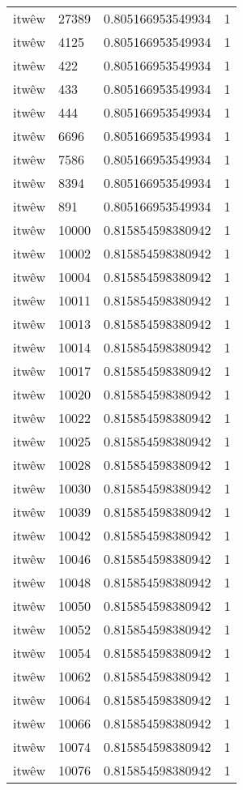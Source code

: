 \begin{longtable}{llll}
itwêw & 27389 & 0.805166953549934 & 1 \\
itwêw & 4125 & 0.805166953549934 & 1 \\
itwêw & 422 & 0.805166953549934 & 1 \\
itwêw & 433 & 0.805166953549934 & 1 \\
itwêw & 444 & 0.805166953549934 & 1 \\
itwêw & 6696 & 0.805166953549934 & 1 \\
itwêw & 7586 & 0.805166953549934 & 1 \\
itwêw & 8394 & 0.805166953549934 & 1 \\
itwêw & 891 & 0.805166953549934 & 1 \\
itwêw & 10000 & 0.815854598380942 & 1 \\
itwêw & 10002 & 0.815854598380942 & 1 \\
itwêw & 10004 & 0.815854598380942 & 1 \\
itwêw & 10011 & 0.815854598380942 & 1 \\
itwêw & 10013 & 0.815854598380942 & 1 \\
itwêw & 10014 & 0.815854598380942 & 1 \\
itwêw & 10017 & 0.815854598380942 & 1 \\
itwêw & 10020 & 0.815854598380942 & 1 \\
itwêw & 10022 & 0.815854598380942 & 1 \\
itwêw & 10025 & 0.815854598380942 & 1 \\
itwêw & 10028 & 0.815854598380942 & 1 \\
itwêw & 10030 & 0.815854598380942 & 1 \\
itwêw & 10039 & 0.815854598380942 & 1 \\
itwêw & 10042 & 0.815854598380942 & 1 \\
itwêw & 10046 & 0.815854598380942 & 1 \\
itwêw & 10048 & 0.815854598380942 & 1 \\
itwêw & 10050 & 0.815854598380942 & 1 \\
itwêw & 10052 & 0.815854598380942 & 1 \\
itwêw & 10054 & 0.815854598380942 & 1 \\
itwêw & 10062 & 0.815854598380942 & 1 \\
itwêw & 10064 & 0.815854598380942 & 1 \\
itwêw & 10066 & 0.815854598380942 & 1 \\
itwêw & 10074 & 0.815854598380942 & 1 \\
itwêw & 10076 & 0.815854598380942 & 1 \\

\end{longtable}
